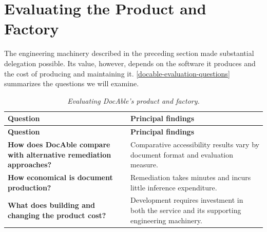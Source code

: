 


\chapter{Evaluating the Product and Factory}\label{heading:economics}



The engineering machinery described in the preceding section made substantial delegation possible. Its value, however, depends on the software it produces and the cost of producing and maintaining it. \autoref{docable-evaluation-questions} summarizes the questions we will examine.

{\footnotesize
\begin{longtable}[]{@{}
  >{\raggedright\arraybackslash}p{}
  >{\raggedright\arraybackslash}p{}@{}}
\caption[Evaluating DocAble's product and factory]{\emph{Evaluating DocAble's product and factory.}}\label{docable-evaluation-questions}\tabularnewline
\toprule\noalign{}
\textbf{Question} & \textbf{Principal findings} \\
\midrule\noalign{}
\endfirsthead
\toprule\noalign{}
\textbf{Question} & \textbf{Principal findings} \\
\midrule\noalign{}
\endhead
\bottomrule\noalign{}
\endlastfoot
\textbf{How does DocAble compare with alternative remediation approaches?} & Comparative accessibility results vary by document format and evaluation measure. \\
\textbf{How economical is document production?} & Remediation takes minutes and incurs little inference expenditure. \\
\textbf{What does building and changing the product cost?} & Development requires investment in both the service and its supporting engineering machinery. \\
\end{longtable}
}

